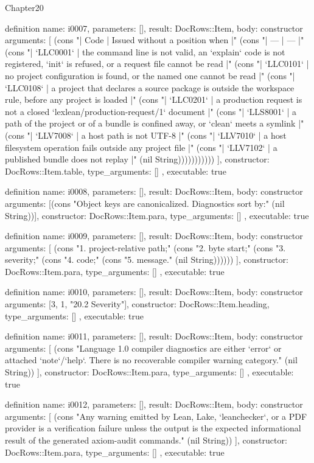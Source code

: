 \begin{lexlean}{Chapter20}
\begin{semanticmodule}
definition{
  name: i0007,
  parameters: [],
  result: DocRows::Item,
  body: constructor{
    arguments: [
      (cons "| Code | Issued without a position when |" (cons "| --- | --- |" (cons "| `LLC0001` | the command line is not valid, an `explain` code is not registered, `init` is refused, or a request file cannot be read |" (cons "| `LLC0101` | no project configuration is found, or the named one cannot be read |" (cons "| `LLC0108` | a project that declares a source package is outside the workspace rule, before any project is loaded |" (cons "| `LLC0201` | a production request is not a closed `lexlean/production-request/1` document |" (cons "| `LLS8001` | a path of the project or of a bundle is confined away, or `clean` meets a symlink |" (cons "| `LLV7008` | a host path is not UTF-8 |" (cons "| `LLV7010` | a host filesystem operation fails outside any project file |" (cons "| `LLV7102` | a published bundle does not replay |" (nil String)))))))))))
    ],
    constructor: DocRows::Item.table,
    type_arguments: []
  },
  executable: true
}

definition{
  name: i0008,
  parameters: [],
  result: DocRows::Item,
  body: constructor{
    arguments: [(cons "Object keys are canonicalized. Diagnostics sort by:" (nil String))],
    constructor: DocRows::Item.para,
    type_arguments: []
  },
  executable: true
}

definition{
  name: i0009,
  parameters: [],
  result: DocRows::Item,
  body: constructor{
    arguments: [
      (cons "1. project-relative path;" (cons "2. byte start;" (cons "3. severity;" (cons "4. code;" (cons "5. message." (nil String))))))
    ],
    constructor: DocRows::Item.para,
    type_arguments: []
  },
  executable: true
}

definition{
  name: i0010,
  parameters: [],
  result: DocRows::Item,
  body: constructor{
    arguments: [3, 1, "20.2 Severity"],
    constructor: DocRows::Item.heading,
    type_arguments: []
  },
  executable: true
}

definition{
  name: i0011,
  parameters: [],
  result: DocRows::Item,
  body: constructor{
    arguments: [
      (cons "Language 1.0 compiler diagnostics are either `error` or attached `note`/`help`. There is no recoverable compiler warning category." (nil String))
    ],
    constructor: DocRows::Item.para,
    type_arguments: []
  },
  executable: true
}

definition{
  name: i0012,
  parameters: [],
  result: DocRows::Item,
  body: constructor{
    arguments: [
      (cons "Any warning emitted by Lean, Lake, `leanchecker`, or a PDF provider is a verification failure unless the output is the expected informational result of the generated axiom-audit commands." (nil String))
    ],
    constructor: DocRows::Item.para,
    type_arguments: []
  },
  executable: true
}


\end{semanticmodule}
\end{lexlean}

